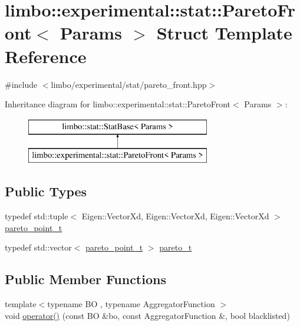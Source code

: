 \hypertarget{structlimbo_1_1experimental_1_1stat_1_1_pareto_front}{}\section{limbo\+:\+:experimental\+:\+:stat\+:\+:Pareto\+Front$<$ Params $>$ Struct Template Reference}
\label{structlimbo_1_1experimental_1_1stat_1_1_pareto_front}


{\ttfamily \#include $<$limbo/experimental/stat/pareto\+\_\+front.\+hpp$>$}

Inheritance diagram for limbo\+:\+:experimental\+:\+:stat\+:\+:Pareto\+Front$<$ Params $>$\+:\begin{figure}[H]
\begin{center}
\leavevmode
\includegraphics[height=2.000000cm]{structlimbo_1_1experimental_1_1stat_1_1_pareto_front}
\end{center}
\end{figure}
\subsection*{Public Types}
\begin{DoxyCompactItemize}
\item 
typedef std\+::tuple$<$ Eigen\+::\+Vector\+Xd, Eigen\+::\+Vector\+Xd, Eigen\+::\+Vector\+Xd $>$ \hyperlink{structlimbo_1_1experimental_1_1stat_1_1_pareto_front_a07a9d1b38b8c942ec0666841ec310ed8}{pareto\+\_\+point\+\_\+t}
\item 
typedef std\+::vector$<$ \hyperlink{structlimbo_1_1experimental_1_1stat_1_1_pareto_front_a07a9d1b38b8c942ec0666841ec310ed8}{pareto\+\_\+point\+\_\+t} $>$ \hyperlink{structlimbo_1_1experimental_1_1stat_1_1_pareto_front_ad43dd449215fa8e506851c3f7fc96940}{pareto\+\_\+t}
\end{DoxyCompactItemize}
\subsection*{Public Member Functions}
\begin{DoxyCompactItemize}
\item 
{\footnotesize template$<$typename B\+O , typename Aggregator\+Function $>$ }\\void \hyperlink{structlimbo_1_1experimental_1_1stat_1_1_pareto_front_aa9576e145574a7c7dede0d7497388fec}{operator()} (const B\+O \&bo, const Aggregator\+Function \&, bool blacklisted)
\end{DoxyCompactItemize}


